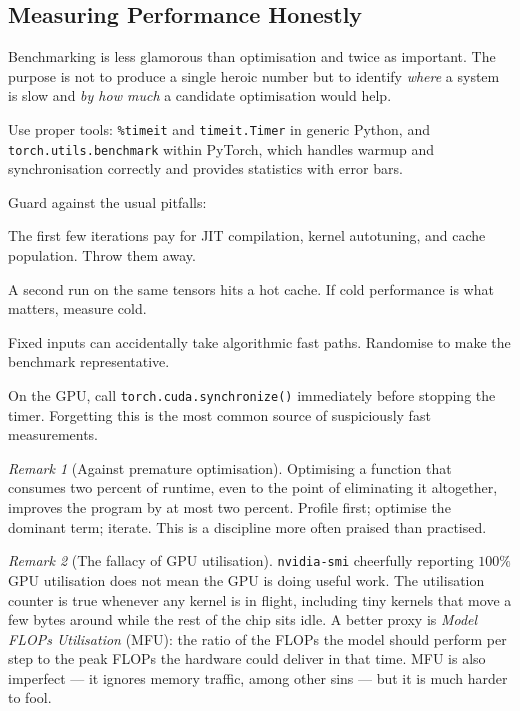 \documentclass[11pt,a4paper]{article}
\theoremstyle{definition}
\theoremstyle{remark}
\newtheorem*{remark}{Remark}
\theoremstyle{plain}
\begin{document}
\subsection{Measuring Performance Honestly}

Benchmarking is less glamorous than optimisation and twice as
important. The purpose is not to produce a single heroic number but
to identify \emph{where} a system is slow and \emph{by how much} a
candidate optimisation would help.

Use proper tools: \texttt{\%timeit} and \texttt{timeit.Timer} in
generic Python, and \texttt{torch.utils.benchmark} within PyTorch,
which handles warmup and synchronisation correctly and provides
statistics with error bars.

Guard against the usual pitfalls:
\begin{description}[leftmargin=1.5em, style=nextline]
    \item[Warmup.] The first few iterations pay for JIT compilation,
          kernel autotuning, and cache population. Throw them away.
    \item[Caching and preallocation.] A second run on the same
          tensors hits a hot cache. If cold performance is what
          matters, measure cold.
    \item[Randomisation.] Fixed inputs can accidentally take
          algorithmic fast paths. Randomise to make the benchmark
          representative.
    \item[Synchronisation.] On the GPU, call
          \texttt{torch.cuda.synchronize()} immediately before
          stopping the timer. Forgetting this is the most common
          source of suspiciously fast measurements.
\end{description}

\begin{remark}[Against premature optimisation]
Optimising a function that consumes two percent of runtime, even to
the point of eliminating it altogether, improves the program by at
most two percent. Profile first; optimise the dominant term;
iterate. This is a discipline more often praised than practised.
\end{remark}

\begin{remark}[The fallacy of GPU utilisation]
\texttt{nvidia-smi} cheerfully reporting $100\%$ GPU utilisation
does not mean the GPU is doing useful work. The utilisation counter
is true whenever any kernel is in flight, including tiny kernels
that move a few bytes around while the rest of the chip sits idle.
A better proxy is \emph{Model FLOPs Utilisation} (MFU): the ratio of
the FLOPs the model should perform per step to the peak FLOPs the
hardware could deliver in that time. MFU is also imperfect --- it
ignores memory traffic, among other sins --- but it is much harder
to fool.
\end{remark}
\end{document}
